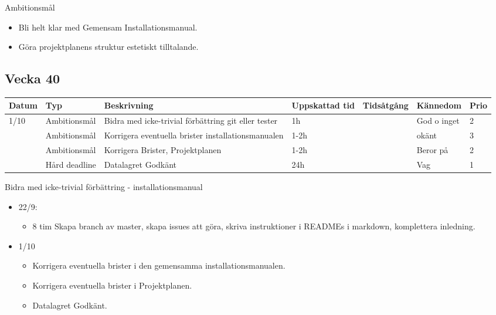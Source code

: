 \documentclass{TDP003mall}
\begin{document}
      Ambitionsmål
\begin{itemize}
\item Bli helt klar med Gemensam Installationsmanual.
  \item Göra projektplanens struktur estetiskt tilltalande.
  \end{itemize}

\newpage

\subsection{Vecka 40}
\begin{tabularx}{\linewidth}{|l|l|X|l|l|l|l|}
	\hline
	Datum & Typ           & Beskrivning                                         & Uppskattad tid & Tidsåtgång & Kännedom    & Prio \\ [0.5ex]
	\hline                                                      
	1/10  & Ambitionsmål  & Bidra med icke-trivial förbättring git eller tester & 1h             &            & God o inget & 2    \\
	\hline                                                      
          & Ambitionsmål  & Korrigera eventuella brister installationsmanualen  & 1-2h           &            & okänt       & 3    \\
	\hline                                                      
          & Ambitionsmål  & Korrigera Brister, Projektplanen                    & 1-2h           &            & Beror på    & 2    \\
	\hline                                                      
          & Hård deadline & Datalagret Godkänt                                  & 24h            &            & Vag         & 1    \\
	\hline
\end{tabularx}

Bidra med icke-trivial förbättring - installationsmanual
\begin{itemize}
\item 22/9:
  \begin{itemize}
  \item 8 tim Skapa branch av master, skapa issues att göra, skriva instruktioner i READMEs i markdown, komplettera inledning.\\
  \end{itemize}
\item 1/10
  \begin{itemize}
  \item Korrigera eventuella brister i den gemensamma installationsmanualen.\\
  \item Korrigera eventuella brister i Projektplanen.\\
  \item  Datalagret Godkänt.\\    
  \end{itemize}
\end{itemize}
\end{document}
